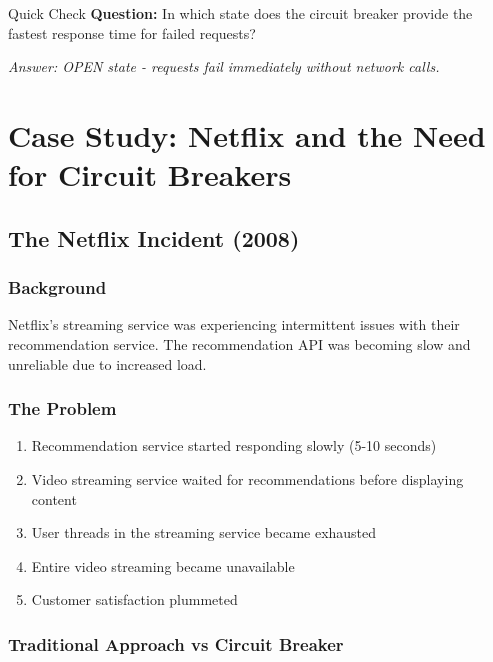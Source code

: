\documentclass[12pt,a4paper]{article}
\begin{document}
\begin{interactivebox}{Quick Check}
\textbf{Question:} In which state does the circuit breaker provide the fastest response time for failed requests?

\textit{Answer: OPEN state - requests fail immediately without network calls.}
\end{interactivebox}

\section{Case Study: Netflix and the Need for Circuit Breakers}

\subsection{The Netflix Incident (2008)}

\subsubsection{Background}
Netflix's streaming service was experiencing intermittent issues with their recommendation service. The recommendation API was becoming slow and unreliable due to increased load.

\subsubsection{The Problem}
\begin{enumerate}
    \item Recommendation service started responding slowly (5-10 seconds)
    \item Video streaming service waited for recommendations before displaying content
    \item User threads in the streaming service became exhausted
    \item Entire video streaming became unavailable
    \item Customer satisfaction plummeted
\end{enumerate}

\subsubsection{Traditional Approach vs Circuit Breaker}
\end{document}
